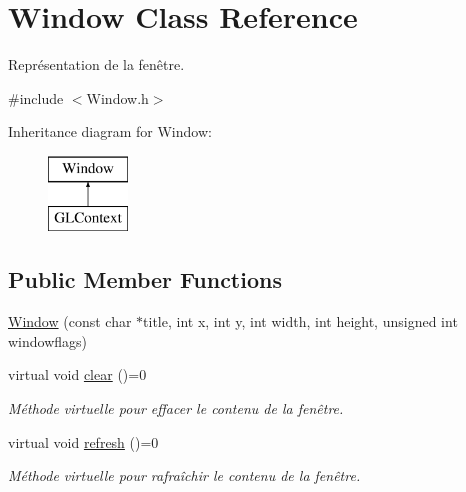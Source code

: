 \hypertarget{class_window}{}\section{Window Class Reference}
\label{class_window}


Représentation de la fenêtre.  




{\ttfamily \#include $<$Window.\+h$>$}

Inheritance diagram for Window\+:\begin{figure}[H]
\begin{center}
\leavevmode
\includegraphics[height=2.000000cm]{class_window}
\end{center}
\end{figure}
\subsection*{Public Member Functions}
\begin{DoxyCompactItemize}
\item 
\hyperlink{class_window_a96efd3d806565db46c9328c64347a48e}{Window} (const char $\ast$title, int x, int y, int width, int height, unsigned int windowflags)
\item 
\hypertarget{class_window_ab3914a3846297c08fe8aa8cd724c8fc8}{}virtual void \hyperlink{class_window_ab3914a3846297c08fe8aa8cd724c8fc8}{clear} ()=0\label{class_window_ab3914a3846297c08fe8aa8cd724c8fc8}

\begin{DoxyCompactList}\small\item\em Méthode virtuelle pour effacer le contenu de la fenêtre. \end{DoxyCompactList}\item 
\hypertarget{class_window_ac36d7bab3105b0a4c3d5d94fc6ad6fdd}{}virtual void \hyperlink{class_window_ac36d7bab3105b0a4c3d5d94fc6ad6fdd}{refresh} ()=0\label{class_window_ac36d7bab3105b0a4c3d5d94fc6ad6fdd}

\begin{DoxyCompactList}\small\item\em Méthode virtuelle pour rafraîchir le contenu de la fenêtre. \end{DoxyCompactList}\end{DoxyCompactItemize}
